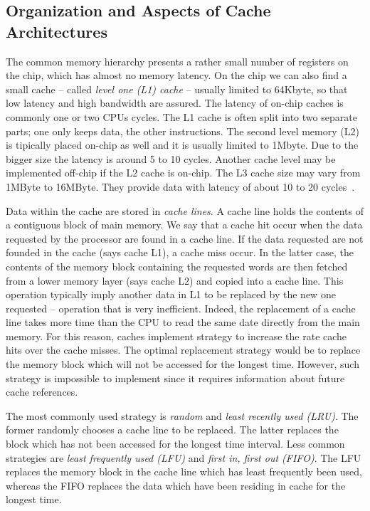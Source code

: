 \subsection{Organization and Aspects of Cache Architectures}
The common memory hierarchy presents a rather small number of registers on the chip, which has almost no memory latency. On the chip we can also find a small cache -- called \textit{level one (L1) cache} -- usually limited to 64Kbyte, so that low latency and high bandwidth are assured. The latency of on-chip caches is commonly one or two CPUs cycles. The L1 cache is often split into two separate parts; one only keeps data, the other instructions. The second level memory (L2) is tipically placed on-chip as well and it is usually limited to 1Mbyte. Due to the bigger size the  latency is around 5 to 10 cycles. Another cache level may be implemented off-chip if the L2 cache is on-chip. The L3 cache size may vary from 1MByte to 16MByte. They provide data with latency of about 10 to 20 cycles~\citep{Hennessy-Patterson}.

Data within the cache are stored in \textit{cache lines}. A cache line holds the contents of a contiguous block of main memory. We say that a cache hit occur when the data requested by the processor are found in a cache line. If the data requested are not founded in the cache (says cache L1), a cache miss occur. In the latter case, the contents of the memory block containing the requested words are then fetched from a lower memory layer (says cache L2) and copied into a cache line. This operation typically imply another data in L1 to be replaced by the new one requested -- operation that is very inefficient. Indeed, the replacement of a cache line takes more time than the CPU to read the same date directly from the main memory. For this reason, caches implement strategy to increase the rate cache hits  over the cache misses. The optimal replacement strategy would be to replace the memory block which will not be accessed for the longest time. However, such strategy is impossible to implement since it requires information about future cache references. 

The most commonly used strategy is \textit{random} and \textit{least recently used (LRU)}. The former randomly chooses a cache line to be replaced. The latter replaces the block which has not been accessed for the longest time interval. Less common strategies are \textit{least frequently used (LFU)} and \textit{first in, first out (FIFO)}. The LFU replaces the memory block in the cache line which has least frequently been used, whereas the FIFO replaces the data which have been residing in cache for the longest time.

